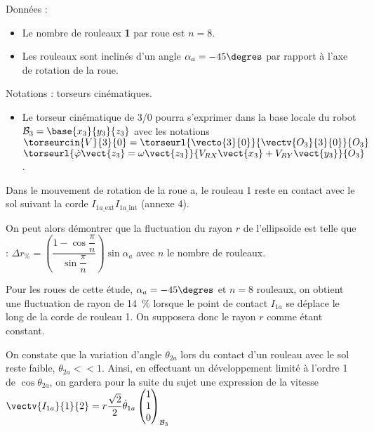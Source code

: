 Données : 
\begin{itemize}
\item Le nombre de rouleaux \textbf{1} par roue est $n=8$. 
\item Les rouleaux sont inclinés d'un angle $\alpha_a=-45\degres$ par rapport à l'axe de rotation de la roue.
\end{itemize}

Notations : torseurs cinématiques.
\begin{itemize}
\item Le torseur cinématique de 3/0 pourra s'exprimer dans la base locale du robot $\mathcal{B}_3 = \base{x_3}{y_3}{z_3}$ avec les notations $\torseurcin{V}{3}{0} = \torseurl{\vecto{3}{0}}{\vectv{O_3}{3}{0}}{O_3}$
$\torseurl{\dot{\varphi}\vect{z_3}=\omega \vect{z_3}}{V_{RX}\vect{x_3}+V_{RY}\vect{y_3}}{O_3}$.
\end{itemize}

Dans le mouvement de rotation de la roue a, le rouleau 1 reste en contact avec le sol suivant la corde 
$I_{1a\_\text{ext}}I_{1a\_\text{int}}$ (annexe 4).


On peut alors démontrer que la fluctuation du rayon $r$ de l'ellipsoïde est telle que : $\Delta r_{\%} = \left( \dfrac{1-\cos\dfrac{\pi}{n}}{\sin \dfrac{\pi }{n}}\right)\sin \alpha_a$ avec $n$ le nombre de rouleaux. 


Pour les roues de cette étude, $\alpha_a=-45\degres$ et $n=8$ rouleaux, on obtient une fluctuation de rayon de \SI{14}{\%} lorsque le point de contact $I_{1a}$ se déplace le long de la corde de rouleau 1. On supposera donc le rayon $r$ comme étant constant. 

\ifprof%
\begin{corrige}
\end{corrige}\else\fi

On constate que la variation d'angle $\theta_{2a}$ lors du contact d'un rouleau avec le sol reste faible, 
$\theta_{2a} << 1$. Ainsi, en effectuant un développement limité à l'ordre 1 de $\cos \theta_{2a}$, on gardera pour la suite du sujet une expression de la vitesse $\vectv{I_{1a}}{1}{2}=r\dfrac{\sqrt{2}}{2}\dot{\theta}_{1a} \begin{pmatrix}
1 \\ 1 \\ 0 \end{pmatrix}_{\mathcal{B}_3}$

\ifprof%
\begin{corrige}
\end{corrige}\else\fi

